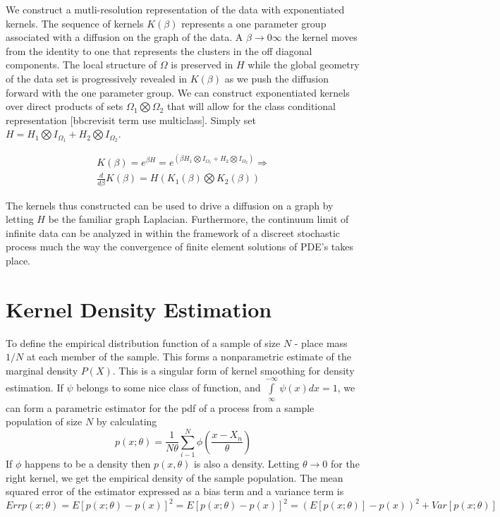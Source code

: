 We construct a mutli-resolution representation of the data with exponentiated kernels.  The sequence of kernels $K(\beta)$ represents a one parameter group associated with a diffusion on the graph of the data.  A $\beta \rightarrow  0 \infty$ the kernel moves from the identity to one that represents the clusters in the off diagonal components.  The local structure of $\Omega$ is preserved in $H$ while the global geometry of the data set is progressively revealed in $K(\beta)$ as we push the diffusion forward with the one parameter group.  We can construct exponentiated kernels over direct products of sets $\Omega_1 \bigotimes \Omega_2$ that will allow for the class conditional representation [bbcrevisit term use multiclass].  Simply set $H = H_1 \bigotimes I_{\Omega_1} +  H_2 \bigotimes I_{\Omega_2}$.
\begin{center}\begin{eqnarray*}
K(\beta) = e^{\beta H} =  e^{(\beta H_1 \bigotimes I_{\Omega_1} +  H_2 \bigotimes I_{\Omega_2})} \Rightarrow \\
\frac{d}{d \beta} K(\beta) =  H (K_1(\beta) \bigotimes K_2(\beta))
\end{eqnarray*}\end{center}

The kernels thus  constructed can be used to drive a diffusion on a graph by letting $H$ be the familiar graph Laplacian.  Furthermore, the continuum limit of infinite data can be analyzed in within the framework of a discreet stochastic process much the way the convergence of finite element solutions of PDE's takes place.


\section{Kernel Density Estimation}
To define the empirical distribution function of a sample of size $N$ - place mass $1/N$ at each member of the sample.  This forms a nonparametric estimate of the marginal density $P(X)$.  This is a singular form of kernel smoothing for density estimation.  If $\psi$ belongs to some nice class of function, and $\int\limits_{\infty}^{-\infty}\psi(x) dx = 1$, we can form a parametric estimator for the pdf of a process from a sample
population of size $N$ by calculating
\begin{equation} p(x;\theta)=\frac{1}{N \theta}
\sum\limits_{i-1}^{N} \phi( \frac{x-X_n}{\theta})
\end{equation}  If $\phi$ happens to be a density then $p(x,
\theta)$ is also a density.  Letting $\theta \rightarrow 0$ for
the right kernel, we get the empirical density of the sample
population.  The mean squared error of the estimator expressed
as a bias term and a variance term is \begin{equation} Err
p(x;\theta)= E[p(x;\theta)-p(x)]^2 =  E[ p(x;\theta)-p(x)]^2 =
(E[p(x;\theta)]-p(x))^2 + Var[ p(x;\theta)]
\end{equation}


